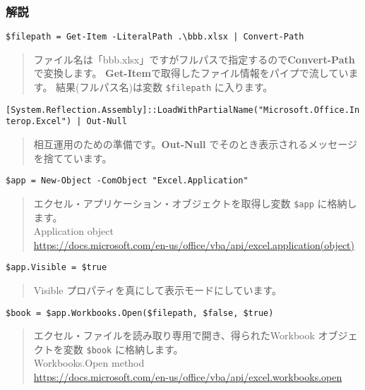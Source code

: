 \documentclass[dvipdfmx]{jsarticle}
\begin{document}
\subsubsection{解説}

\verb+$filepath = Get-Item -LiteralPath .\bbb.xlsx | Convert-Path+

\begin{quote}
ファイル名は「bbb.xlsx」ですがフルパスで指定するので\textbf{Convert-Path}で変換します。
\textbf{Get-Item}で取得したファイル情報をパイプで流しています。
結果(フルパス名)は変数 \verb+$filepath+ に入ります。
\end{quote}

\vspace{\baselineskip}

\verb+[System.Reflection.Assembly]::LoadWithPartialName("Microsoft.Office.Interop.Excel") | Out-Null+

\begin{quote}
相互運用のための準備です。\textbf{Out-Null} でそのとき表示されるメッセージを捨てています。
\end{quote}

\vspace{\baselineskip}

\verb+$app = New-Object -ComObject "Excel.Application"+

\begin{quote}
エクセル・アプリケーション・オブジェクトを取得し変数 \verb+$app+ に格納します。 \\
Application object \\
\href{https://docs.microsoft.com/en-us/office/vba/api/excel.application(object)}{https://docs.microsoft.com/en-us/office/vba/api/excel.application(object)}
\end{quote}


\vspace{\baselineskip}

\verb+$app.Visible = $true+
\begin{quote}
Visible プロパティを真にして表示モードにしています。
\end{quote}


\vspace{\baselineskip}

\verb+$book = $app.Workbooks.Open($filepath, $false, $true)+
\begin{quote}
エクセル・ファイルを読み取り専用で開き、得られたWorkbook オブジェクトを変数 \verb+$book+ に格納します。 \\
Workbooks.Open method \\
\href{https://docs.microsoft.com/en-us/office/vba/api/excel.workbooks.open}{https://docs.microsoft.com/en-us/office/vba/api/excel.workbooks.open}
\end{quote}
\end{document}
